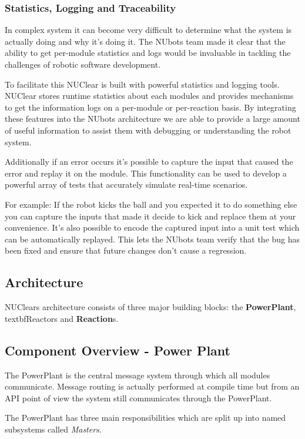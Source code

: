 \documentclass[english,12pt]{scrartcl}
\begin{document}
			\subsubsection{Statistics, Logging and Traceability}
				In complex system it can become very difficult to determine what the system is actually doing and why it's doing it. 
				The NUbots team made it clear that the ability to get per-module statistics and logs would be invaluable in tackling the challenges of robotic software development.
				
				To facilitate this NUClear is built with powerful statistics and logging tools. NUClear stores runtime statistics about each modules and provides mechanisms to get the information logs on a per-module or per-reaction basis. 
				By integrating these features into the NUbots architecture we are able to provide a large amount of useful information to assist them with debugging or understanding the robot system. 
				
				Additionally if an error occurs it's possible to capture the input that caused the error and replay it on the module. 
				This functionality can be used to develop a powerful array of tests that accurately simulate real-time scenarios.
				
				For example: If the robot kicks the ball and you expected it to do something else you can capture the inputs that made it decide to kick and replace them at your convenience. 
				It's also possible to encode the captured input into a unit test which can be automatically replayed. 
				This lets the NUbots team verify that the bug has been fixed and ensure that future changes don't cause a regression.
		
		\subsection{Architecture}
			NUClears architecture consists of three major building blocks: the \textbf{PowerPlant}, textbf{Reactor}s and \textbf{Reaction}s. 
		
		\subsection{Component Overview - Power Plant}
			The PowerPlant is the central message system through which all modules communicate. 
			Message routing is actually performed at compile time but from an API point of view the system still communicates through the PowerPlant.
			
			The PowerPlant has three main responsibilities which are split up into named subsystems called \emph{Masters}.
			
\end{document}
